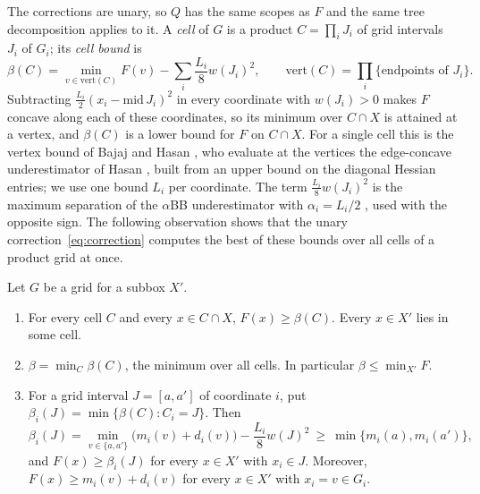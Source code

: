 The corrections are unary, so $Q$ has the same scopes as $F$ and the same
tree decomposition applies to it. A \emph{cell} of $G$ is a product
$C=\prod_iJ_i$ of grid intervals $J_i$ of $G_i$; its \emph{cell bound} is
\[
\beta(C)=\min_{v\in\mathrm{vert}(C)}F(v)-\sum_i\frac{L_i}{8}w(J_i)^2,
\qquad\mathrm{vert}(C)=\prod_i\{\text{endpoints of }J_i\}.
\]
Subtracting $\frac{L_i}2(x_i-\mathrm{mid}\,J_i)^2$ in every coordinate with
$w(J_i)>0$ makes $F$ concave along each of these coordinates, so its minimum
over $C\cap X$ is attained at a vertex, and $\beta(C)$ is a lower bound for
$F$ on $C\cap X$. For a single cell
this is the vertex bound of Bajaj and Hasan \cite{BajajHasan2020}, who
evaluate at the vertices the edge-concave underestimator of Hasan
\cite{Hasan2018}, built from an upper bound on the diagonal Hessian entries;
we use one bound $L_i$ per coordinate. The term $\frac{L_i}8w(J_i)^2$ is the maximum
separation of the $\alpha$BB underestimator with $\alpha_i=L_i/2$
\cite{MaranasFloudas1994,AdjimanEtAl1998}, used with the opposite sign. The
following observation shows that the unary correction~\eqref{eq:correction}
computes the best of these bounds over all cells of a product grid at once.

\begin{proposition}\label{prop:cellwise}
Let $G$ be a grid for a subbox $X'$.
\begin{enumerate}[label=(\alph*)]
\item For every cell $C$ and every $x\in C\cap X$, $F(x)\ge\beta(C)$. Every
$x\in X'$ lies in some cell.
\item $\beta=\min_C\beta(C)$, the minimum over all cells. In particular
$\beta\le\min_{X'}F$.
\item For a grid interval $J=[a,a']$ of coordinate $i$, put
$\beta_i(J)=\min\{\beta(C):C_i=J\}$. Then
\[
\beta_i(J)=\min_{v\in\{a,a'\}}\bigl(m_i(v)+d_i(v)\bigr)-\frac{L_i}8w(J)^2
\ \ge\ \min\{m_i(a),m_i(a')\},
\]
and $F(x)\ge\beta_i(J)$ for every $x\in X'$ with $x_i\in J$. Moreover,
$F(x)\ge m_i(v)+d_i(v)$ for every $x\in X'$ with $x_i=v\in G_i$.
\end{enumerate}
\end{proposition}

